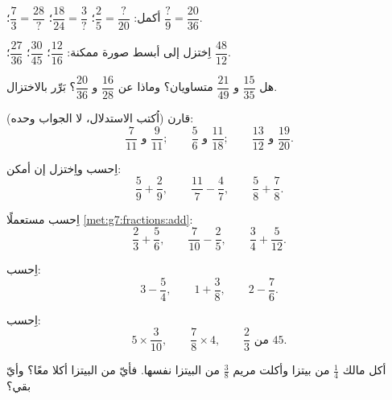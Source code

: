 \begin{exercise}[$\star$]\label{exo:g7:fractions:1}
أكمل: $\dfrac{2}{5} = \dfrac{?}{20}$؛ \quad
$\dfrac{18}{24} = \dfrac{3}{?}$؛ \quad
$\dfrac{7}{3} = \dfrac{28}{?}$؛ \quad
$\dfrac{?}{9} = \dfrac{20}{36}$.
\end{exercise}

\begin{exercise}[$\star$]\label{exo:g7:fractions:2}
اِختزل إلى أبسط صورة ممكنة:
$\dfrac{12}{16}$؛ \quad $\dfrac{30}{45}$؛ \quad $\dfrac{27}{36}$؛
\quad $\dfrac{48}{12}$.
\end{exercise}

\begin{exercise}[$\star$]\label{exo:g7:fractions:3}
هل $\dfrac{15}{35}$ و $\dfrac{21}{49}$ متساويان؟ وماذا عن $\dfrac{16}{28}$
و $\dfrac{20}{36}$؟ بَرِّر بالاختزال.
\end{exercise}

\begin{exercise}[$\star$]\label{exo:g7:fractions:4}
قارن (اُكتب الاستدلال، لا الجواب وحده):
\[
\frac{7}{11} \text{ و } \frac{9}{11}; \qquad
\frac{5}{6} \text{ و } \frac{11}{18}; \qquad
\frac{13}{12} \text{ و } \frac{19}{20}.
\]
\end{exercise}

\begin{exercise}[$\star$]\label{exo:g7:fractions:5}
اِحسب واِختزل إن أمكن:
\[
\frac{5}{9} + \frac{2}{9}, \qquad
\frac{11}{7} - \frac{4}{7}, \qquad
\frac{5}{8} + \frac{7}{8} .
\]
\end{exercise}

\begin{exercise}[$\star$]\label{exo:g7:fractions:6}
اِحسب مستعملًا \cref{met:g7:fractions:add}:
\[
\frac{2}{3} + \frac{5}{6}, \qquad
\frac{7}{10} - \frac{2}{5}, \qquad
\frac{3}{4} + \frac{5}{12} .
\]
\end{exercise}

\begin{exercise}[$\star$]\label{exo:g7:fractions:7}
اِحسب:
\[
3 - \frac{5}{4}, \qquad
1 + \frac{3}{8}, \qquad
2 - \frac{7}{6} .
\]
\end{exercise}

\begin{exercise}[$\star$]\label{exo:g7:fractions:8}
اِحسب:
\[
5 \times \frac{3}{10}, \qquad
\frac{7}{8} \times 4, \qquad
\frac{2}{3} \text{ من } 45 .
\]
\end{exercise}

\begin{exercise}[$\star\star$]\label{exo:g7:fractions:9}
أكل مالك $\frac14$ من بيتزا وأكلت مريم $\frac38$ من البيتزا نفسها.
فأيّ  من البيتزا أكلا معًا؟ وأيّ 
بقي؟
\end{exercise}

